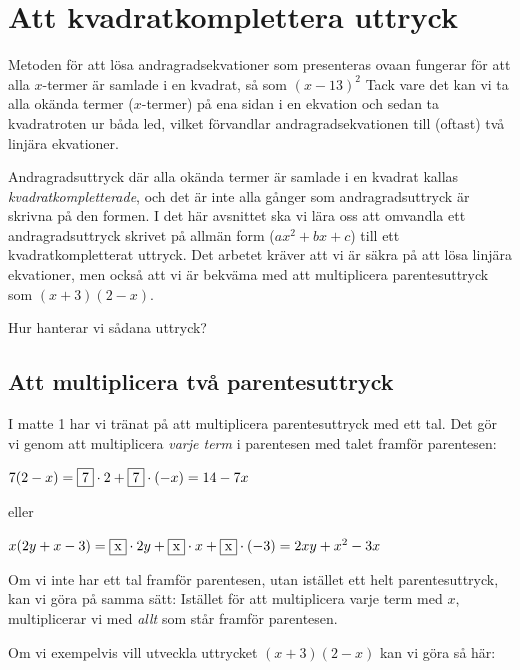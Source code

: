 \section{Att kvadratkomplettera uttryck}

Metoden för att lösa andragradsekvationer som presenteras ovaan fungerar för att alla $x$-termer är samlade i en kvadrat, så som $(x - 13)^2$
Tack vare det kan vi ta alla okända termer ($x$-termer) på ena sidan i en ekvation och sedan ta kvadratroten ur båda led, vilket förvandlar andragradsekvationen till (oftast) två linjära ekvationer.

Andragradsuttryck där alla okända termer är samlade i en kvadrat kallas \emph{kvadratkompletterade}, och det är inte alla gånger som andragradsuttryck är skrivna på den formen.
I det här avsnittet ska vi lära oss att omvandla ett andragradsuttryck skrivet på allmän form ($ax^2 + bx + c$) till ett kvadratkompletterat uttryck.
Det arbetet kräver att vi är säkra på att lösa linjära ekvationer, men också att vi är bekväma med att multiplicera parentesuttryck som $(x+3)(2-x)$.

Hur hanterar vi sådana uttryck?

\subsection{Att multiplicera två parentesuttryck}

I matte 1 har vi tränat på att multiplicera parentesuttryck med ett tal.
Det gör vi genom att multiplicera \emph{varje term} i parentesen med talet framför parentesen:

\begin{center}
$7(2-x) = \framebox{7} \cdot 2 + \framebox{7} \cdot (-x) = 14 - 7x$

eller

$x(2y+x-3) = \framebox{x} \cdot 2y + \framebox{x} \cdot x + \framebox{x} \cdot (-3) = 2xy + x^2 - 3x$
\end{center}

Om vi inte har ett tal framför parentesen, utan istället ett helt parentesuttryck, kan vi göra på samma sätt:
Istället för att multiplicera varje term med $x$, multiplicerar vi med \emph{allt} som står framför parentesen.

Om vi exempelvis vill utveckla uttrycket $(x+3)(2-x)$ kan vi göra så här:

